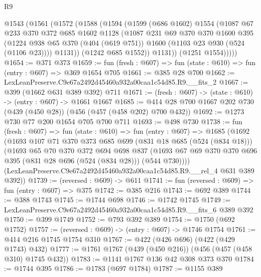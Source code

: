 \begin{lexlean}{R9}
\begin{coremodule}
      @1543
        (@1561
          (@1572
            (@1588
              (@1594
                (@1599
                  (@686 @1602)
                  @1554
                  (@1087
                    @67
                    @233
                    @370
                    @372
                    @685
                    @1602
                    @1128
                    (@1087
                      @231
                      @69
                      @370
                      @370
                      @1600
                      @395
                      (@1224
                        @938
                        @65
                        @370
                        (@404 (@619 @751))
                        @1600
                        (@1103 @23 @930 (@524 (@1106 @23))))
                      @1131))
                  (@1242 @685 @1552))
                @1131))
            (@1251 @1554)))))
@1654 := @371 @373
@1659 := fun (fresh : @607) => fun (state : @610) => fun (entry : @607) => @369 @1654 @705
@1661 := @385 @28 @700
@1662 := LexLeanPreserve.C9e67a2492d45460a932a00caa1c54d85.R9.__fits_2
@1667 := @399 (@1662 @631 @389 @392) @711
@1671 := (fresh : @607) -> (state : @610) -> (entry : @607) -> @1661 @1667
@1685 := @414 @28 @700 @1667 @202 @730 (@439 (@450 @28)) (@456 (@457 (@458 @202) @700 @432))
@1692 := @1273 @730 @77 @200 @1654 @705 @700 @711
@1693 := @498 @730
@1738 := fun (fresh : @607) =>
  fun (state : @610) =>
  fun (entry : @607) =>
  @1685
    (@1692
      (@1693
        @107
        @71
        @370
        @373
        @685
        @699
        (@831 @18 @685 (@524 (@834 @18)))
        (@1693
          @65
          @70
          @370
          @372
          @694
          @698
          @837
          (@1693 @67 @69 @370 @370 @696 @395 (@831 @28 @696 (@524 (@834 @28))) (@544 @730))))
      (LexLeanPreserve.C9e67a2492d45460a932a00caa1c54d85.R9.__rel_4 @631 @389 @392))
@1739 := (reversed : @609) -> @611
@1741 := fun (reversed : @609) => fun (entry : @607) => @375
@1742 := @385 @216
@1743 := @692 @389
@1744 := @388 @1743
@1745 := @1744 @698
@1746 := @1742 @1745
@1749 := LexLeanPreserve.C9e67a2492d45460a932a00caa1c54d85.R9.__fits_6 @389 @392
@1750 := @399 @1749
@1752 := @793 @392 @389
@1754 := @1750 (@692 @1752)
@1757 := (reversed : @609) -> (entry : @607) -> @1746 @1754
@1761 := @414 @216 @1745 @1754 @310
@1767 := @422 (@426 @696) (@422 (@429 @1743) @432)
@1777 := @1761 @1767 (@439 (@450 @216)) (@456 (@457 (@458 @310) @1745 @432))
@1783 := @1141 @1767 @136 @42 @308 @373 @370
@1784 := @1744 @395
@1786 := @1783 (@697 @1784)
@1787 := @1155 @389

\end{coremodule}
\end{lexlean}
